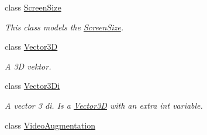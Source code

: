 \begin{DoxyCompactItemize}
class \hyperlink{class_a_rdev_kit_1_1_model_1_1_project_1_1_screen_size}{Screen\-Size}
\begin{DoxyCompactList}\small\item\em This class models the \hyperlink{class_a_rdev_kit_1_1_model_1_1_project_1_1_screen_size}{Screen\-Size}. \end{DoxyCompactList}\item 
class \hyperlink{class_a_rdev_kit_1_1_model_1_1_project_1_1_vector3_d}{Vector3\-D}
\begin{DoxyCompactList}\small\item\em A 3\-D vektor. \end{DoxyCompactList}\item 
class \hyperlink{class_a_rdev_kit_1_1_model_1_1_project_1_1_vector3_di}{Vector3\-Di}
\begin{DoxyCompactList}\small\item\em A vector 3 di. Is a \hyperlink{class_a_rdev_kit_1_1_model_1_1_project_1_1_vector3_d}{Vector3\-D} with an extra int variable. \end{DoxyCompactList}\item 
class \hyperlink{class_a_rdev_kit_1_1_model_1_1_project_1_1_video_augmentation}{Video\-Augmentation}
\end{DoxyCompactItemize}
